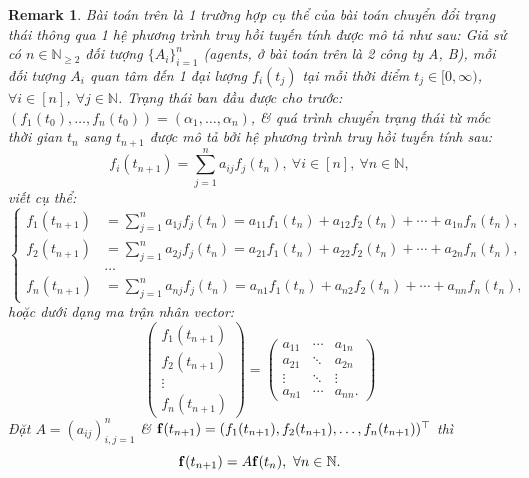 \documentclass{article}
\newtheorem{remark}{Remark}
\begin{document}
\begin{remark}
	Bài toán trên là 1 trường hợp cụ thể của bài toán chuyển đổi trạng thái thông qua 1 hệ phương trình truy hồi tuyến tính được mô tả như sau: Giả sử có $n\in\mathbb{N}_{\ge2}$ đối tượng $\{A_i\}_{i=1}^n$ (agents, ở bài toán trên là 2 công ty A, B), mỗi đối tượng $A_i$ quan tâm đến 1 đại lượng $f_i(t_j)$ tại mỗi thời điểm $t_j\in[0,\infty)$, $\forall i\in[n]$, $\forall j\in\mathbb{N}$. Trạng thái ban đầu được cho trước: $(f_1(t_0),\ldots,f_n(t_0)) = (\alpha_1,\ldots,\alpha_n)$, \& quá trình chuyển trạng thái từ mốc thời gian $t_n$ sang $t_{n+1}$ được mô tả bởi hệ phương trình truy hồi tuyến tính sau:
	\begin{equation*}
		f_i(t_{n+1}) = \sum_{j=1}^n a_{ij}f_j(t_n),\ \forall i\in[n],\ \forall n\in\mathbb{N},
	\end{equation*}
	viết cụ thể:
	\begin{equation*}
		\left\{\begin{split}
			f_1(t_{n+1}) &= \sum_{j=1}^n a_{1j}f_j(t_n) = a_{11}f_1(t_n) + a_{12}f_2(t_n) + \cdots + a_{1n}f_n(t_n),\\
			f_2(t_{n+1}) &= \sum_{j=1}^n a_{2j}f_j(t_n) = a_{21}f_1(t_n) + a_{22}f_2(t_n) + \cdots + a_{2n}f_n(t_n),\\
			&\ldots\\
			f_n(t_{n+1}) &= \sum_{j=1}^n a_{nj}f_j(t_n) = a_{n1}f_1(t_n) + a_{n2}f_2(t_n) + \cdots + a_{nn}f_n(t_n),
		\end{split}\right.
	\end{equation*}
	hoặc dưới dạng ma trận nhân vector:
	\begin{equation*}
		\begin{pmatrix}
			f_1(t_{n+1})\\f_2(t_{n+1})\\\vdots\\f_n(t_{n+1})
		\end{pmatrix} = \begin{pmatrix}
			a_{11} & \cdots & a_{1n}\\a_{21} & \ddots & a_{2n}\\\vdots & \ddots & \vdots\\a_{n1} & \cdots & a_{nn}.
		\end{pmatrix}
	\end{equation*}
	Đặt $A = (a_{ij})_{i,j=1}^n$ \& ${\bf f}(t_{n+1}) = (f_1(t_{n+1}),f_2(t_{n+1}),\ldots,f_n(t_{n+1}))^\top$ thì
	\begin{equation*}
		{\bf f}(t_{n+1}) = A{\bf f}(t_n),\ \forall n\in\mathbb{N}.
	\end{equation*}

\end{remark}
\end{document}
